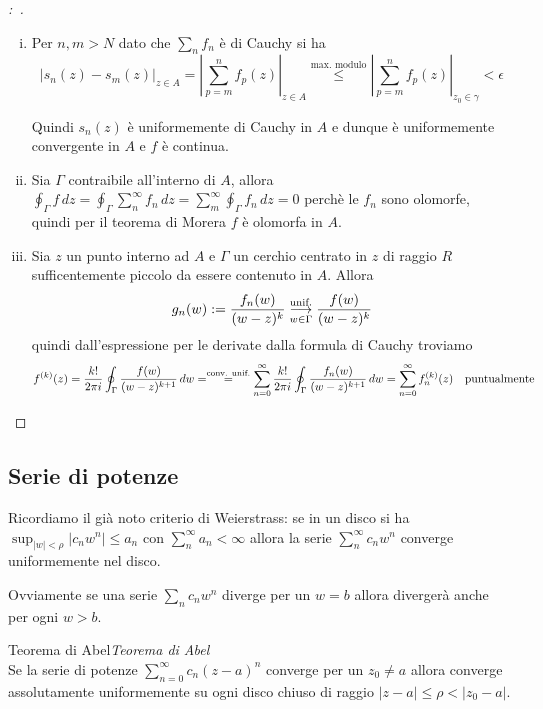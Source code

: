 \documentclass[11pt,a4paper,twoside]{book}
\newenvironment{teorema}[1][\empty]{\begin{Teorema}{
\ifx\empty#1\relax\else\mdseries\itshape#1\\\fi
}{}}{\end{Teorema}}
\newenvironment{dimo}[1][\proofname]{
	\begin{tcolorbox}[
	breakable, 
	enhanced, 
	interior hidden, 
	frame hidden, 
	borderline west = {1pt}{0pt}{gray}, 
	top=0pt, bottom=0pt, left=0pt]
\begin{proof}[#1:~]
}
{
\end{proof}
\end{tcolorbox}
}
\theoremstyle{esss}
\theoremstyle{dotless}
\numberwithin{equation}{section} %
\begin{document}
\begin{dimo}~\begin{enumerate}[i.] 
\item Per $n,m>N$ dato che $\sum_n f_n$ è di Cauchy si ha \[|s_n(z)-s_m(z)|_{z\in A}=\left|\sum_{p=m}^n f_p(z)\right|_{z\in A}\overset{\text{max. modulo}}{\leq} \left|\sum_{p=m}^n f_p(z)\right|_{z_0\in \gamma}<\epsilon\]

Quindi $s_n(z)$ è uniformemente di Cauchy in $A$ e dunque è uniformemente convergente in $A$ e $f$ è continua.

\item Sia $\Gamma$ contraibile all'interno di $A$, allora $\oint_\Gamma f\, dz=\oint_\Gamma\sum_n^\infty f_n \, dz=\sum_m^\infty \oint_{\Gamma} f_n\,dz=0$ perchè le $f_n$ sono olomorfe, quindi per il teorema di Morera $f$ è olomorfa in $A$.

\item Sia $z$  un punto interno ad $A$ e $\Gamma$ un cerchio centrato in $z$ di raggio $R$ sufficentemente piccolo da essere contenuto in $A$. Allora
\[g_n(w):=\dfrac{f_n(w)}{(w-z)^k}\overunderset{\text{unif.}}{w\in\Gamma}{\longrightarrow}\dfrac{f(w)}{(w-z)^k}
\]
quindi dall'espressione per le derivate dalla formula di Cauchy troviamo
\[
f^{(k)}(z)=\dfrac{k!}{2\pi i} \oint_{\Gamma}\dfrac{f(w)}{(w-z)^{k+1}}\, dw =\overset{\text{conv. unif.}}{=}\sum_{n=0}^\infty \dfrac{k!}{2\pi i} \oint_{\Gamma} \dfrac{f_n(w)}{(w-z)^{k+1}}\,dw=\sum_{n=0}^\infty f_n^{(k)}(z) \quad \text{puntualmente} \qedhere
\]
\end{enumerate}
\end{dimo}

\subsection{Serie di potenze}

Ricordiamo il già noto criterio di Weierstrass: se in un disco si ha $\sup_{|w|<\rho} |c_n w^n|\leq a_n$ con $\sum_n^\infty a_n<\infty$ allora la serie $\sum_n^\infty c_n w^n$ converge uniformemente nel disco.

Ovviamente se una serie $\sum_n c_n w^n$ diverge per un $w=b$ allora divergerà anche per ogni $w>b$.

\begin{teorema}[Teorema di Abel]
Se la serie di potenze $\sum_{n=0}^\infty c_n(z-a)^n$ converge per un $z_0\neq a$ allora converge assolutamente uniformemente su ogni disco chiuso di raggio $|z-a|\leq \rho <|z_0-a|$.
\end{teorema}
\end{document}
